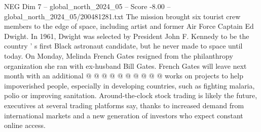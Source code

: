 \begin{textsample}{NEG Dim 7 – global\_north\_2024\_05 – Score -8.00 – global\_north\_2024\_05/200481281.txt}
The mission brought six tourist crew members to the edge of space, including artist and former Air Force Captain Ed Dwight.
In 1961, Dwight was selected by President John F.
Kennedy to be the country ' s first Black astronaut candidate, but he never made to space until today.
On Monday, Melinda French Gates resigned from the philanthropy organization she ran with ex-husband Bill Gates.
French Gates will leave next month with an additional @ @ @ @ @ @ @ @ @ @ works on projects to help impoverished people, especially in developing countries, such as fighting malaria, polio or improving sanitation.
Around-the-clock stock trading is likely the future, executives at several trading platforms say, thanks to increased demand from international markets and a new generation of investors who expect constant online access.

\end{textsample}
